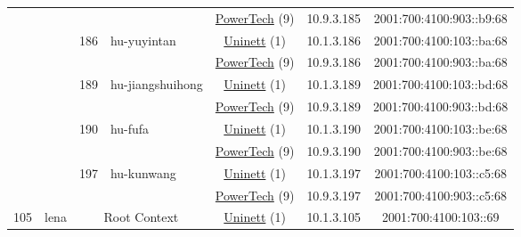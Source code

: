 \begin{small}
\begin{center}
\begin{longtable}{|c|c|c|c|c|c|c|c|}
  &  &  &  & \multicolumn{2}{|c|}{\tiny{\href{http://www.powertech.no}{PowerTech} (9)}} & \tiny{10.9.3.185} & \tiny{2001:700:4100:903::b9:68} \\* \cline{3-3}\cline{4-4}\cline{5-5}\cline{6-6}\cline{7-7}\cline{8-8}
  &  & \multirow{2}{*}{\tiny{186}} & \multicolumn{1}{|l|}{\multirow{2}{*}{\tiny{hu-yuyintan}}} & \multicolumn{2}{|c|}{\tiny{\href{https://www.uninett.no}{Uninett} (1)}} & \tiny{10.1.3.186} & \tiny{2001:700:4100:103::ba:68} \\* \cline{5-5}\cline{6-6}\cline{7-7}\cline{8-8}
  &  &  &  & \multicolumn{2}{|c|}{\tiny{\href{http://www.powertech.no}{PowerTech} (9)}} & \tiny{10.9.3.186} & \tiny{2001:700:4100:903::ba:68} \\* \cline{3-3}\cline{4-4}\cline{5-5}\cline{6-6}\cline{7-7}\cline{8-8}
  &  & \multirow{2}{*}{\tiny{189}} & \multicolumn{1}{|l|}{\multirow{2}{*}{\tiny{hu-jiangshuihong}}} & \multicolumn{2}{|c|}{\tiny{\href{https://www.uninett.no}{Uninett} (1)}} & \tiny{10.1.3.189} & \tiny{2001:700:4100:103::bd:68} \\* \cline{5-5}\cline{6-6}\cline{7-7}\cline{8-8}
  &  &  &  & \multicolumn{2}{|c|}{\tiny{\href{http://www.powertech.no}{PowerTech} (9)}} & \tiny{10.9.3.189} & \tiny{2001:700:4100:903::bd:68} \\* \cline{3-3}\cline{4-4}\cline{5-5}\cline{6-6}\cline{7-7}\cline{8-8}
  &  & \multirow{2}{*}{\tiny{190}} & \multicolumn{1}{|l|}{\multirow{2}{*}{\tiny{hu-fufa}}} & \multicolumn{2}{|c|}{\tiny{\href{https://www.uninett.no}{Uninett} (1)}} & \tiny{10.1.3.190} & \tiny{2001:700:4100:103::be:68} \\* \cline{5-5}\cline{6-6}\cline{7-7}\cline{8-8}
  &  &  &  & \multicolumn{2}{|c|}{\tiny{\href{http://www.powertech.no}{PowerTech} (9)}} & \tiny{10.9.3.190} & \tiny{2001:700:4100:903::be:68} \\* \cline{3-3}\cline{4-4}\cline{5-5}\cline{6-6}\cline{7-7}\cline{8-8}
  &  & \multirow{2}{*}{\tiny{197}} & \multicolumn{1}{|l|}{\multirow{2}{*}{\tiny{hu-kunwang}}} & \multicolumn{2}{|c|}{\tiny{\href{https://www.uninett.no}{Uninett} (1)}} & \tiny{10.1.3.197} & \tiny{2001:700:4100:103::c5:68} \\* \cline{5-5}\cline{6-6}\cline{7-7}\cline{8-8}
  &  &  &  & \multicolumn{2}{|c|}{\tiny{\href{http://www.powertech.no}{PowerTech} (9)}} & \tiny{10.9.3.197} & \tiny{2001:700:4100:903::c5:68} \\ \hline
 \multirow{22}{*}{\tiny{105}} & \multicolumn{1}{|l|}{\multirow{22}{*}{\tiny{lena}}} & \multicolumn{2}{|c|}{\multirow{2}{*}{\tiny{Root Context}}} & \multicolumn{2}{|c|}{\tiny{\href{https://www.uninett.no}{Uninett} (1)}} & \tiny{10.1.3.105} & \tiny{2001:700:4100:103::69} \\* \cline{5-5}\cline{6-6}\cline{7-7}\cline{8-8}

\end{longtable}
\end{center}
\end{small}
